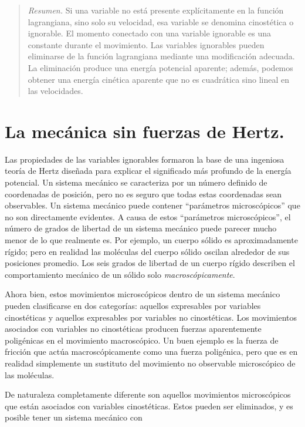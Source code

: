\documentclass[12pt,a4paper]{book}
\begin{document}

\begin{quote}
\textit{Resumen.} Si una variable no está presente explícitamente en la función lagrangiana, sino solo su velocidad, esa variable se denomina cinostética o ignorable. El momento conectado con una variable ignorable es una constante durante el movimiento. Las variables ignorables pueden eliminarse de la función lagrangiana mediante una modificación adecuada. La eliminación produce una energía potencial aparente; además, podemos obtener una energía cinética aparente que no es cuadrática sino lineal en las velocidades.
\end{quote}

\section{La mecánica sin fuerzas de Hertz.}

Las propiedades de las variables ignorables formaron la base de una ingeniosa teoría de Hertz diseñada para explicar el significado más profundo de la energía potencial. Un sistema mecánico se caracteriza por un número definido de coordenadas de posición, pero no es seguro que todas estas coordenadas sean observables. Un sistema mecánico puede contener ``parámetros microscópicos'' que no son directamente evidentes. A causa de estos ``parámetros microscópicos'', el número de grados de libertad de un sistema mecánico puede parecer mucho menor de lo que realmente es. Por ejemplo, un cuerpo sólido es aproximadamente rígido; pero en realidad las moléculas del cuerpo sólido oscilan alrededor de sus posiciones promedio. Los seis grados de libertad de un cuerpo rígido describen el comportamiento mecánico de un sólido solo \textit{macroscópicamente}.

Ahora bien, estos movimientos microscópicos dentro de un sistema mecánico pueden clasificarse en dos categorías: aquellos expresables por variables cinostéticas y aquellos expresables por variables no cinostéticas. Los movimientos asociados con variables no cinostéticas producen fuerzas aparentemente poligénicas en el movimiento macroscópico. Un buen ejemplo es la fuerza de fricción que actúa macroscópicamente como una fuerza poligénica, pero que es en realidad simplemente un sustituto del movimiento no observable microscópico de las moléculas.

De naturaleza completamente diferente son aquellos movimientos microscópicos que están asociados con variables cinostéticas. Estos pueden ser eliminados, y es posible tener un sistema mecánico con
\end{document}

